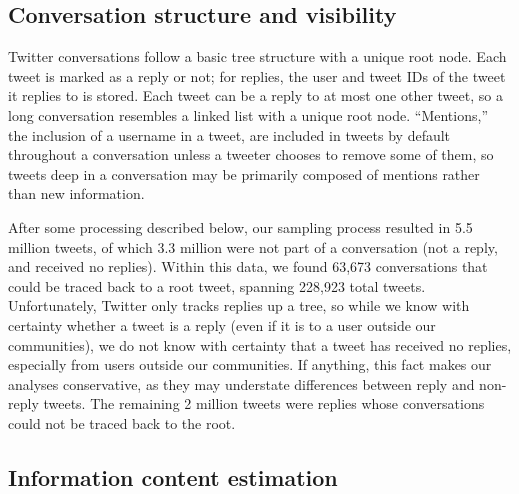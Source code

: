 \documentclass[11pt,letterpaper]{article}
\begin{document}
\subsection{Conversation structure and visibility}\label{sect:conversation}

Twitter conversations follow a basic tree structure with a unique root node. Each tweet is marked as a reply or not; for replies, the user and tweet IDs of the tweet it replies to is stored. Each tweet can be a reply to at most one other tweet, so a long conversation resembles a linked list with a unique root node. ``Mentions,'' the inclusion of a username in a tweet, are included in tweets by default throughout a conversation unless a tweeter chooses to remove some of them, so tweets deep in a conversation may be primarily composed of mentions rather than new information.  


After some processing described below, our sampling process resulted in 5.5 million tweets, of which 3.3 million were not part of a conversation (not a reply, and received no replies).  Within this data, we found 63,673 conversations that could be traced back to a root tweet, spanning 228,923 total tweets. Unfortunately, Twitter only tracks replies up a tree, so while we know with certainty whether a tweet is a reply (even if it is to a user outside our communities), we do not know with certainty that a tweet has received no replies, especially from users outside our communities. If anything, this fact makes our analyses conservative, as they may understate differences between reply and non-reply tweets. The remaining 2 million tweets were replies whose conversations could not be traced back to the root.

\subsection{Information content estimation}
\end{document}

